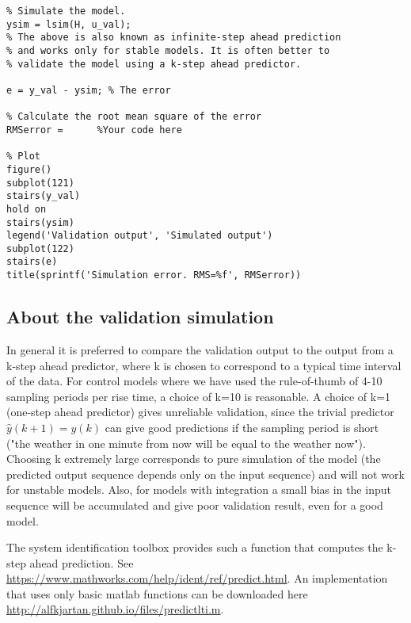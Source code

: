 \documentclass[letterpaper]{scrartcl}
\begin{document}
\begin{enumerate}
\begin{verbatim}
% Simulate the model. 
ysim = lsim(H, u_val); 
% The above is also known as infinite-step ahead prediction
% and works only for stable models. It is often better to 
% validate the model using a k-step ahead predictor. 

e = y_val - ysim; % The error

% Calculate the root mean square of the error
RMSerror =      %Your code here 

% Plot
figure()
subplot(121)
stairs(y_val)
hold on
stairs(ysim)
legend('Validation output', 'Simulated output')
subplot(122)
stairs(e)
title(sprintf('Simulation error. RMS=%f', RMSerror))
\end{verbatim}
\end{enumerate}

\subsection{About the validation simulation}
\label{sec-1-2}
In general it is preferred to compare the validation output to the output from a k-step ahead predictor, where k is chosen to correspond to a typical time interval of the data. For control models where we have used the rule-of-thumb of 4-10 sampling periods per rise time, a choice of k=10 is reasonable. A choice of k=1 (one-step ahead predictor) gives unreliable validation, since the trivial predictor \(\hat{y}(k+1) = y(k)\) can give good predictions if the sampling period is short ("the weather in one minute from now will be equal to the weather now"). Choosing k extremely large corresponds to pure simulation of the model (the predicted output sequence depends only on the input sequence) and will not work for unstable models. Also, for models with integration a small bias in the input sequence will be accumulated and give poor validation result, even for a good model. 

The system identification toolbox provides such a function that computes the k-step ahead prediction. See  \url{https://www.mathworks.com/help/ident/ref/predict.html}. An implementation that uses only basic matlab functions can be downloaded here \url{http://alfkjartan.github.io/files/predictlti.m}. 
\end{document}

